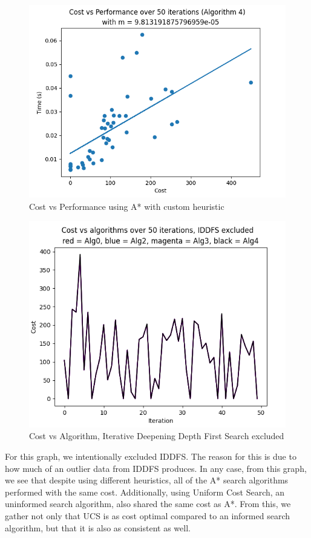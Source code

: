 \documentclass[a4paper]{article}
\begin{document}
\begin{figure}[ht]
    \centering
    \includegraphics[width=\textwidth]{CVPALG4.png}
    \caption{Cost vs Performance using A* with custom heuristic}
    \label{fig:CostVsPerformanceAlg4}
\end{figure}
\newpage
\begin{figure}[ht]
    \centering
    \includegraphics[width=\textwidth]{CVA50N.png}
    \caption{Cost vs Algorithm, Iterative Deepening Depth First Search excluded}
    \label{fig:CostVsAlgs}
\end{figure}
For this graph, we intentionally excluded IDDFS. The reason for this is due to how much of an outlier data from IDDFS produces. In any case, from this graph, we see that despite using different heuristics, all of the A* search algorithms performed with the same cost. Additionally, using Uniform Cost Search, an uninformed search algorithm, also shared the same cost as A*. From this, we gather not only that UCS is as cost optimal compared to an informed search algorithm, but that it is also as consistent as well.
\end{document}
